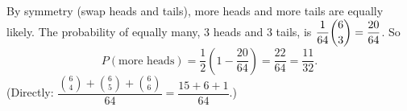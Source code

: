 By symmetry (swap heads and tails), more heads and more tails are equally likely. The probability of equally many, $3$ heads and $3$ tails, is $\dfrac{1}{64}\dbinom63=\dfrac{20}{64}$. So
\[P(\text{more heads})=\dfrac{1}{2}\left(1-\dfrac{20}{64}\right)=\dfrac{22}{64}=\boxed{\dfrac{11}{32}}.\]
(Directly: $\dfrac{\binom64+\binom65+\binom66}{64}=\dfrac{15+6+1}{64}$.)
